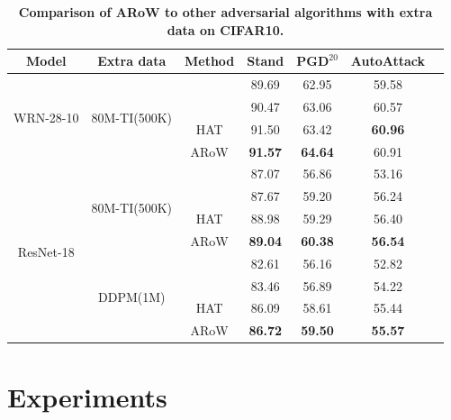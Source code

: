 \documentclass[nohyperref]{article}
\theoremstyle{plain}
\theoremstyle{definition}
\theoremstyle{remark}
\begin{document}
\begin{table}[ht]
    \caption{\textbf{Comparison of ARoW to other adversarial algorithms with extra data on CIFAR10.}}
    \centering
    \begin{tabular}{c|c|ccccc}
    \hline
    \textbf{Model} & \textbf{Extra data} & \textbf{Method}  & \textbf{Stand}  & $\textbf{PGD}^{20}$ & \textbf{AutoAttack} \\
    \hline
    \hline
    \multirow{4}{*}{WRN-28-10} & \multirow{4}{*}{80M-TI(500K)}
         & \citet{carmon2019unlabeled}  & 89.69 & 62.95 & 59.58 & \\
    &    & \citet{rebuffi2021data}      & 90.47 & 63.06 & 60.57 & \\
    &    & HAT                      & 91.50 & 63.42 & \textbf{60.96} & \\
    &    & ARoW                     & \textbf{91.57} & \textbf{64.64} & 60.91 & \\
    \cline{2-7}
    \hline
    \multirow{8}{*}{ResNet-18} & \multirow{4}{*}{80M-TI(500K)}
    & \citet{carmon2019unlabeled}  &  87.07 & 56.86 & 53.16 &   \\
    & & \citet{rebuffi2021data}    & 87.67 & 59.20 & 56.24  \\
    & & HAT                     & 88.98 & 59.29 & 56.40   \\
    & & ARoW                  &  \textbf{89.04} & \textbf{60.38} & \textbf{56.54} &   \\
    \cline{2-7}
    & \multirow{4}{*}{DDPM(1M)}
    & \citet{carmon2019unlabeled} & 82.61 & 56.16 & 52.82 & \\
    & & \citet{rebuffi2021data}  & 83.46 & 56.89 & 54.22 \\
    & & HAT                   & 86.09 & 58.61 & 55.44 \\
    & & ARoW                & \textbf{86.72} & \textbf{59.50} & \textbf{55.57} &\\
    \hline
    \end{tabular}
    \label{table-extra}
    \vskip -0.1in
\end{table}
\section{Experiments}
\label{sec4}
\end{document}
